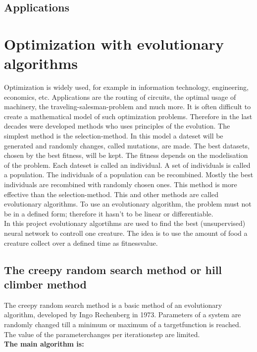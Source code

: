 \documentclass[10pt,a4paper,DIV=11]{scrreprt}
\begin{document}
\section{Applications}




\chapter{Optimization with evolutionary algorithms}
Optimization is widely used, for example in information technology, engineering,
economics, etc. Applications are the routing of circuits, the optimal usage of machinery,
the traveling-salesman-problem and much more. It is often difficult to create a mathematical
model of such optimization problems. Therefore in the last decades were developed methods who
uses principles of the evolution.
The simplest method is the selection-method. In this model a dateset will be generated and randomly
changes, called mutations, are made. The best datasets, chosen by the best fitness, will be kept. The fitness depends on the modelisation of the problem.
Each dateset is called an individual. A set of individuals is called a population. The individuals
of a population can be recombined. Mostly the best individuals are recombined with randomly chosen
ones. This method is more effective than the selection-method. This and other methods are  called
evolutionary algorithms. To use an evolutionary algorithm, the problem must not be in a defined form;
therefore it hasn't to be linear or differentiable. \\

In this project evolutionary algortihms are used to find the best 
(unsupervised) neural network to controll one creature. The idea is to use the amount of food a creature collect over a defined time as fitnessvalue.

\section{The creepy random search method or hill climber method}
The creepy random search method is a basic method of an evolutionary algorithm, developed by Ingo Rechenberg in 1973. %
Parameters of a system are randomly changed till a minimum or maximum of a targetfunction is reached. The value of the parameterchanges per iterationstep are limited. \\

\textbf{The main algorithm is:}
\end{document}
